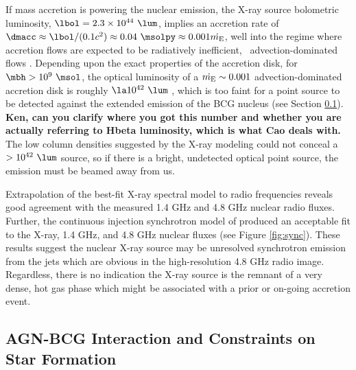 \documentclass[11pt, preprint]{aastex}
\begin{document}
If mass accretion is powering the nuclear emission, the X-ray source
bolometric luminosity, $\lbol = 2.3 \times 10^{44} ~\lum$, implies an
accretion rate of $\dmacc \approx \lbol/(0.1 c^2) \approx 0.04
~\msolpy \approx 0.001 \dme$, well into the regime where accretion
flows are expected to be radiatively inefficient,
\eg\ advection-dominated flows \citep{adaf}. Depending upon the exact
properties of the accretion disk, for $\mbh > 10^9 ~\msol$, the
optical luminosity of a $\dot{m_{\rm{E}}} \sim 0.001$ advection-dominated
accretion disk is roughly $\la 10^{42} ~\lum$
\citep{2002ApJ...570L..13C}, which is too faint for a point source to
be detected against the extended emission of the BCG nucleus (see
Section \ref{sec:bcg}). {\bf Ken, can you clarify where you got this
  number and whether you are actually referring to Hbeta luminosity,
  which is what Cao deals with.}  The low column densities suggested
by the X-ray modeling could not conceal a $> 10^{42} ~\lum$ source, so
if there is a bright, undetected optical point source, the emission
must be beamed away from us.

Extrapolation of the best-fit X-ray spectral model to radio
frequencies reveals good agreement with the measured 1.4 GHz and 4.8
GHz nuclear radio fluxes. Further, the continuous injection
synchrotron model of \citet{1987MNRAS.225..335H} produced an
acceptable fit to the X-ray, 1.4 GHz, and 4.8 GHz nuclear fluxes (see
Figure \ref{fig:sync}). These results suggest the nuclear X-ray source
may be unresolved synchrotron emission from the jets which are obvious
in the high-resolution 4.8 GHz radio image. Regardless, there is no
indication the X-ray source is the remnant of a very dense, hot gas
phase which might be associated with a prior or on-going accretion
event.

\subsection{AGN-BCG Interaction and Constraints on Star Formation}
\label{sec:bcg}
\end{document}
